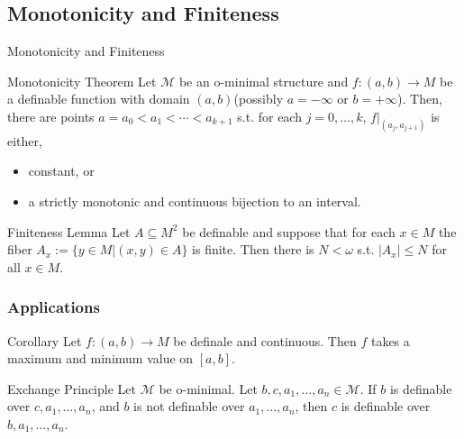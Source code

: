 \subsection{Monotonicity and Finiteness}

\begin{frame}[c]{Monotonicity and Finiteness}
	\begin{block}{Monotonicity Theorem}
		Let $\mathcal{M}$ be an o-minimal structure and $f:(a,b) \to M$ be a definable function with domain $(a,b)$(possibly $a=- \infty$ or $b=+ \infty$).
		Then, there are points $a=a_0<a_1< \cdots <a_{k+1}$ s.t. for each $j=0,\ldots,k$, $f|_{(a_j,a_{j+1})}$ is either,
		\begin{itemize}
			\item constant, or
			\item a strictly monotonic and continuous bijection to an interval.
		\end{itemize}
 	\end{block}

 	\begin{beamerboxesrounded}[shadow=true]{Finiteness Lemma}
 		Let $A \subseteq M^2$ be definable and suppose that for each $x \in M$ the fiber $A_x := \{ y \in M|(x,y) \in A \}$ is finite.
		Then there is $N < \omega$ s.t. $|A_x| \leq N$ for all $x \in M$. 
 	\end{beamerboxesrounded}
\end{frame}


\begin{frame}[c]\frametitle{Applications}	
    
	\begin{block}{Corollary}
		Let $f:(a,b) \to M$ be definale and continuous. Then $f$ takes a maximum and minimum value on $[a,b]$.
	\end{block}

	\begin{block}{Exchange Principle}
		Let $\mathcal{M}$ be o-minimal.
		Let $b,c,a_1,\ldots,a_n \in \mathcal{M}$.
		If $b$ is definable over $c,a_1,\ldots,a_n$, and $b$ is not definable over $a_1,\ldots,a_n$, then $c$ is definable over $b,a_1,\ldots,a_n$.
	\end{block}

\end{frame}

